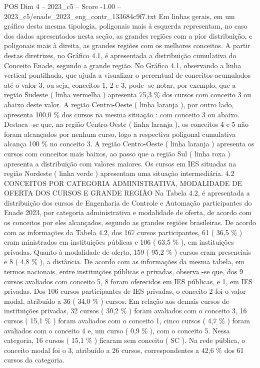 \begin{textsample}{POS Dim 4 – 2023\_c5 – Score -1.00 – 2023\_c5/enade\_2023\_eng\_contr\_133684c9f7.txt}
Em linhas gerais, em um gráfico desta mesma tipologia, poligonais mais à esquerda representam, no caso dos dados apresentados nesta seção, as grandes regiões com a pior distribuição, e poligonais mais à direita, as grandes regiões com os melhores conceitos.
A partir destas diretrizes, no Gráfico 4.1, é apresentada a distribuição cumulativa do Conceito Enade, segundo a grande região.
No Gráfico 4.1, observando a linha vertical pontilhada, que ajuda a visualizar o percentual de conceitos acumulados até o valor 3, ou seja, conceitos 1, 2 e 3, pode -se notar, por exemplo, que a região Sudeste ( linha vermelha ) apresenta 75,3 \% dos cursos com conceito 3 ou abaixo deste valor.
A região Centro-Oeste ( linha laranja ), por outro lado, apresenta 100,0 \% dos cursos na mesma situação : com conceito 3 ou abaixo.
Destaca -se que, na região Centro-Oeste ( linha laranja ), os conceitos 4 e 5 não foram alcançados por nenhum curso, logo a respectiva poligonal cumulativa alcança 100 \% no conceito 3.
A região Centro-Oeste ( linha laranja ) apresenta os cursos com conceitos mais baixos, ao passo que a região Sul ( linha roxa ) apresenta a distribuição com valores maiores.
Os cursos em IES situadas na região Nordeste ( linha verde ) apresentam uma situação intermediária. 4.2 CONCEITOS POR CATEGORIA ADMINISTRATIVA, MODALIDADE DE OFERTA DOS CURSOS E GRANDE REGIÃO Na Tabela 4.2, é apresentada a distribuição dos cursos de Engenharia de Controle e Automação participantes do Enade 2023, por categoria administrativa e modalidade de oferta, de acordo com os conceitos por eles alcançados, segundo as grandes regiões brasileiras.
De acordo com as informações da Tabela 4.2, dos 167 cursos participantes, 61 ( 36,5 \% ) eram ministrados em instituições públicas e 106 ( 63,5 \% ), em instituições privadas.
Quanto à modalidade de oferta, 159 ( 95,2 \% ) cursos eram presenciais e 8 ( 4,8 \% ), a distância.
De acordo com as informações da mesma tabela, em termos nacionais, entre instituições públicas e privadas, observa -se que, dos 9 cursos avaliados com conceito 5, 8 foram oferecidos em IES públicas, e 1, em IES privadas.
Dos 106 cursos participantes de IES privadas, o conceito 2 foi o valor modal, atribuído a 36 ( 34,0 \% ) cursos.
Em relação aos demais cursos de instituições privadas, 32 cursos ( 30,2 \% ) foram avaliados com o conceito 3, 16 cursos ( 15,1 \% ) foram avaliados com o conceito 1, cinco cursos ( 4,7 \% ) foram avaliados com o conceito 4 e, um curso ( 0,9 \% ), com o conceito 5.
Nessa categoria, 16 cursos ( 15,1 \% ) ficaram sem conceito ( SC ).
Na rede pública, o conceito modal foi o 3, atribuído a 26 cursos, correspondentes a 42,6 \% dos 61 cursos da categoria.

\end{textsample}
